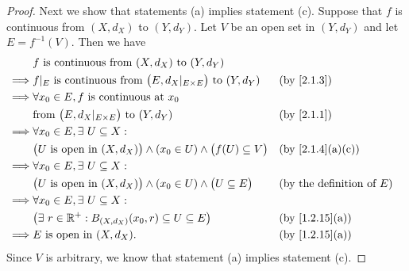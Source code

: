 \begin{proof}
  Next we show that statements (a) implies statement (c).
  Suppose that \(f\) is continuous from \((X, d_X)\) to \((Y, d_Y)\).
  Let \(V\) be an open set in \((Y, d_Y)\) and let \(E = f^{-1}(V)\).
  Then we have
  \begin{align*}
             & f \text{ is continuous from } (X, d_X) \text{ to } (Y, d_Y)                                                                          \\
    \implies & f|_{E} \text{ is continuous from } \big(E, d_X|_{E \times E}\big) \text{ to } (Y, d_Y)      &  & \by{2.1.3}                          \\
    \implies & \forall x_0 \in E, f \text{ is continuous at } x_0                                                                                   \\
             & \text{from } \big(E, d_X|_{E \times E}\big) \text{ to } (Y, d_Y)                            &  & \by{2.1.1}                          \\
    \implies & \forall x_0 \in E, \exists\ U \subseteq X :                                                                                          \\
             & \big(U \text{ is open in } (X, d_X)\big) \land (x_0 \in U) \land \big(f(U) \subseteq V\big) &  & \text{(by \cref{2.1.4}(a)(c))}      \\
    \implies & \forall x_0 \in E, \exists\ U \subseteq X :                                                                                          \\
             & \big(U \text{ is open in } (X, d_X)\big) \land (x_0 \in U) \land \big(U \subseteq E\big)    &  & \text{(by the definition of \(E\))} \\
    \implies & \forall x_0 \in E, \exists\ U \subseteq X :                                                                                          \\
             & \big(\exists\ r \in \R^+ : B_{(X, d_X)}(x_0, r) \subseteq U \subseteq E\big)                &  & \text{(by \cref{1.2.15}(a))}        \\
    \implies & E \text{ is open in } (X, d_X).                                                             &  & \text{(by \cref{1.2.15}(a))}
  \end{align*}
  Since \(V\) is arbitrary, we know that statement (a) implies statement (c).


\end{proof}
